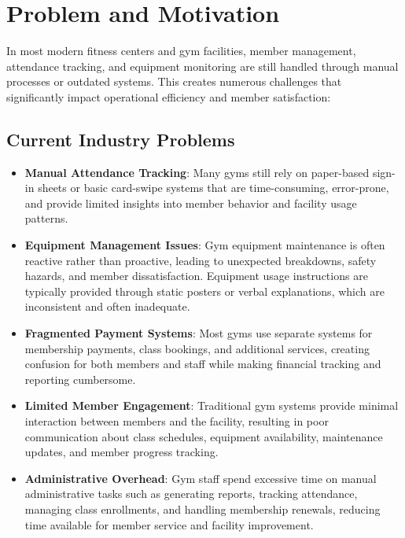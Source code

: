 \documentclass[12pt,a4paper]{report}
\begin{document}
\section{Problem and Motivation}
\label{sec:problem-motivation}

In most modern fitness centers and gym facilities, member management, attendance tracking, and equipment monitoring are still handled through manual processes or outdated systems. This creates numerous challenges that significantly impact operational efficiency and member satisfaction:

\subsection{Current Industry Problems}

\begin{itemize}[leftmargin=*]
    \item \textbf{Manual Attendance Tracking}: Many gyms still rely on paper-based sign-in sheets or basic card-swipe systems that are time-consuming, error-prone, and provide limited insights into member behavior and facility usage patterns.
    
    \item \textbf{Equipment Management Issues}: Gym equipment maintenance is often reactive rather than proactive, leading to unexpected breakdowns, safety hazards, and member dissatisfaction. Equipment usage instructions are typically provided through static posters or verbal explanations, which are inconsistent and often inadequate.
    
    \item \textbf{Fragmented Payment Systems}: Most gyms use separate systems for membership payments, class bookings, and additional services, creating confusion for both members and staff while making financial tracking and reporting cumbersome.
    
    \item \textbf{Limited Member Engagement}: Traditional gym systems provide minimal interaction between members and the facility, resulting in poor communication about class schedules, equipment availability, maintenance updates, and member progress tracking.
    
    \item \textbf{Administrative Overhead}: Gym staff spend excessive time on manual administrative tasks such as generating reports, tracking attendance, managing class enrollments, and handling membership renewals, reducing time available for member service and facility improvement.
    

\end{itemize}
\end{document}

